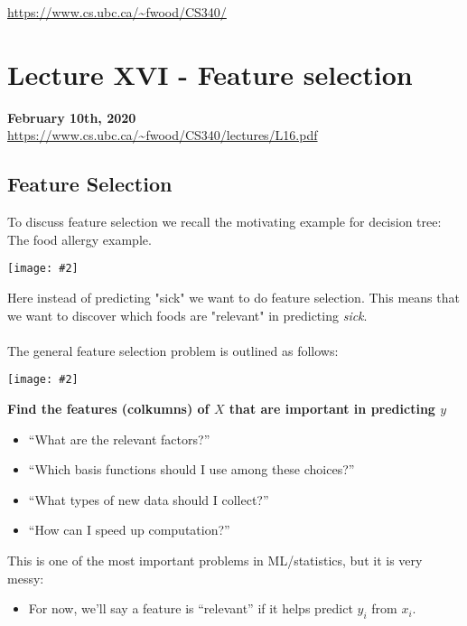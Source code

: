 \documentclass{article}
\def\blu#1{{\color{blu}#1}}
\def\gre#1{{\color{gre}#1}}
\newcommand{\centerfig}[2]{\begin{center}\texttt{[image: \#2]}\end{center}}
\begin{document}
\noindent \url{https://www.cs.ubc.ca/~fwood/CS340/}

\section*{Lecture XVI - Feature selection}
\textbf{February 10th, 2020} \\
\url{https://www.cs.ubc.ca/~fwood/CS340/lectures/L16.pdf}

\subsection*{Feature Selection}
To discuss feature selection we recall the motivating example for decision tree: The food allergy example. 

\centerfig{0.75}{food-allergies}
Here instead of predicting "sick" we want to do feature selection. This means that we want to discover \blu{which foods are "relevant" in predicting \textit{sick}}. \\ \\
The general feature selection problem is outlined as follows:
\centerfig{0.50}{feature-sel1}
\textbf{\gre{Find the features (colkumns) of $ X $ that are important in predicting $ y $}}
\begin{itemize}
	\item “What are the relevant factors?”
	\item “Which basis functions should I use among these choices?”
	\item “What types of new data should I collect?”
	\item “How can I speed up computation?”
\end{itemize}
This is one of the most important problems in ML/statistics, but it is very messy:
\begin{itemize}
	\item For now, we’ll say a feature is “relevant” if it helps \blu{predict $ y_i $ from $ x_i $}.
\end{itemize}
\end{document}
